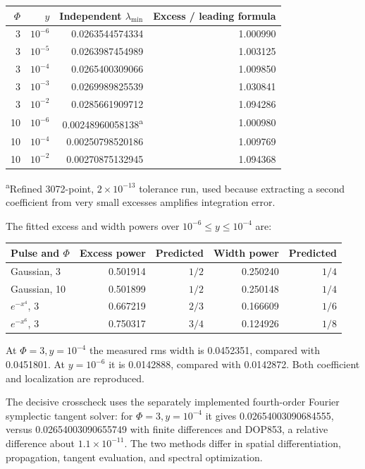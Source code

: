 \documentclass[11pt,a4paper]{article}
\begin{document}
\begin{center}
\begin{tabular}{@{}rrrr@{}}\toprule
$\Phi$ & $y$ & Independent $\lambda_{\min}$ & Excess / leading formula \\\midrule
3 & $10^{-6}$ & 0.0263544574334 & 1.000990 \\
3 & $10^{-5}$ & 0.0263987454989 & 1.003125 \\
3 & $10^{-4}$ & 0.0265400309066 & 1.009850 \\
3 & $10^{-3}$ & 0.0269989825539 & 1.030841 \\
3 & $10^{-2}$ & 0.0285661909712 & 1.094286 \\
10 & $10^{-6}$ & 0.00248960058138\textsuperscript{a} & 1.000980 \\
10 & $10^{-4}$ & 0.00250798520186 & 1.009769 \\
10 & $10^{-2}$ & 0.00270875132945 & 1.094368 \\\bottomrule
\end{tabular}
\end{center}
\textsuperscript{a}Refined 3072-point, $2\times10^{-13}$ tolerance run, used because extracting a second coefficient from very small excesses amplifies integration error.

The fitted excess and width powers over $10^{-6}\le y\le10^{-4}$ are:
\begin{center}
\begin{tabular}{@{}lrrrr@{}}\toprule
Pulse and $\Phi$ & Excess power & Predicted & Width power & Predicted \\\midrule
Gaussian, 3 & 0.501914 & $1/2$ & 0.250240 & $1/4$ \\
Gaussian, 10 & 0.501899 & $1/2$ & 0.250148 & $1/4$ \\
$e^{-x^4}$, 3 & 0.667219 & $2/3$ & 0.166609 & $1/6$ \\
$e^{-x^6}$, 3 & 0.750317 & $3/4$ & 0.124926 & $1/8$ \\\bottomrule
\end{tabular}
\end{center}
At $\Phi=3,y=10^{-4}$ the measured rms width is 0.0452351, compared with 0.0451801. At $y=10^{-6}$ it is 0.0142888, compared with 0.0142872. Both coefficient and localization are reproduced.

The decisive crosscheck uses the separately implemented fourth-order Fourier symplectic tangent solver: for $\Phi=3,y=10^{-4}$ it gives 0.02654003090684555, versus 0.02654003090655749 with finite differences and DOP853, a relative difference about $1.1\times10^{-11}$. The two methods differ in spatial differentiation, propagation, tangent evaluation, and spectral optimization.
\end{document}
